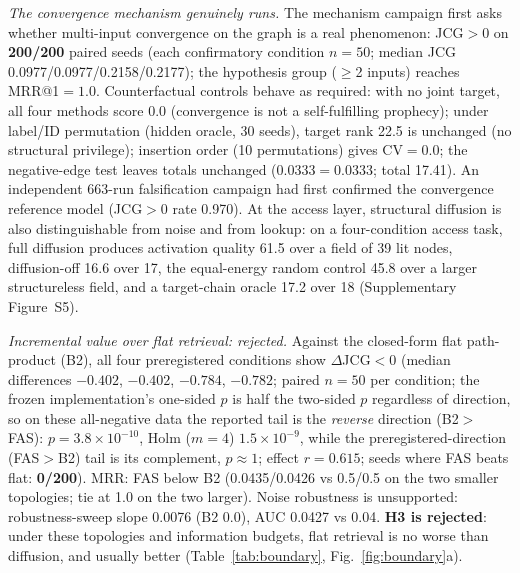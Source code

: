 \documentclass[10pt]{article}
\begin{document}
\emph{The convergence mechanism genuinely runs.} The mechanism campaign first asks whether multi-input convergence on the graph is a real phenomenon: JCG${>}$0 on \textbf{200/200} paired seeds (each confirmatory condition $n{=}50$; median JCG 0.0977/0.0977/0.2158/0.2177); the hypothesis group ($\ge$2 inputs) reaches MRR@1${=}1.0$. Counterfactual controls behave as required: with no joint target, all four methods score 0.0 (convergence is not a self-fulfilling prophecy); under label/ID permutation (hidden oracle, 30 seeds), target rank 22.5 is unchanged (no structural privilege); insertion order (10 permutations) gives CV${=}0.0$; the negative-edge test leaves totals unchanged (0.0333${=}$0.0333; total 17.41). An independent 663-run falsification campaign had first confirmed the convergence reference model (JCG${>}0$ rate 0.970). At the access layer, structural diffusion is also distinguishable from noise and from lookup: on a four-condition access task, full diffusion produces activation quality 61.5 over a field of 39 lit nodes, diffusion-off 16.6 over 17, the equal-energy random control 45.8 over a larger structureless field, and a target-chain oracle 17.2 over 18 (Supplementary Figure~S5).

\emph{Incremental value over flat retrieval: rejected.} Against the closed-form flat path-product (B2), all four preregistered conditions show $\Delta$JCG${<}0$ (median differences ${-}0.402$, ${-}0.402$, ${-}0.784$, ${-}0.782$; paired $n{=}50$ per condition; the frozen implementation's one-sided $p$ is half the two-sided $p$ regardless of direction, so on these all-negative data the reported tail is the \emph{reverse} direction (B2${>}$FAS): $p{=}3.8\times10^{-10}$, Holm ($m{=}4$) $1.5\times10^{-9}$, while the preregistered-direction (FAS${>}$B2) tail is its complement, $p{\approx}1$; effect $r{=}0.615$; seeds where FAS beats flat: \textbf{0/200}). MRR: FAS below B2 (0.0435/0.0426 vs 0.5/0.5 on the two smaller topologies; tie at 1.0 on the two larger). Noise robustness is unsupported: robustness-sweep slope 0.0076 (B2 0.0), AUC 0.0427 vs 0.04. \textbf{H3 is rejected}: under these topologies and information budgets, flat retrieval is no worse than diffusion, and usually better (Table~\ref{tab:boundary}, Fig.~\ref{fig:boundary}a).
\end{document}
